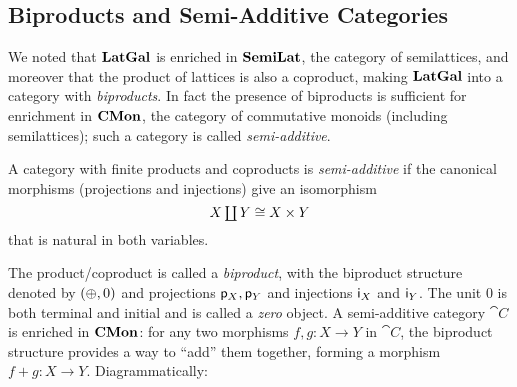 

\subsection{Biproducts and Semi-Additive Categories}
\label{sec:biproducts}

We noted that $\mathbf{LatGal}$ is enriched in $\mathbf{SemiLat}$, the category of semilattices, and moreover that the product
of lattices is also a coproduct, making $\mathbf{LatGal}$ into a category with \emph{biproducts}. In fact the presence
of biproducts is sufficient for enrichment in $\mathbf{CMon}$, the category of commutative monoids (including
semilattices); such a category is called \emph{semi-additive}.

\begin{definition}
\label{def:biproducts:semi-additive}
A category with finite products and coproducts is \emph{semi-additive} if the canonical morphisms (projections
and injections) give an isomorphism
\[\textstyle X \coprod Y \cong X \times Y\] that is natural in both variables.
\end{definition}

The product/coproduct is called a \emph{biproduct}, with the biproduct structure denoted by $(\oplus, 0)$ and
projections $\mathsf{p}_X, \mathsf{p}_Y$ and injections $\mathsf{i}_X$ and $\mathsf{i}_Y$. The unit $0$ is both terminal and
initial and is called a \emph{zero} object. A semi-additive category $\cat{C}$ is enriched in $\mathbf{CMon}$: for any
two morphisms $f, g: X \to Y$ in $\cat{C}$, the biproduct structure provides a way to ``add'' them together,
forming a morphism $f + g: X \to Y$. Diagrammatically:

